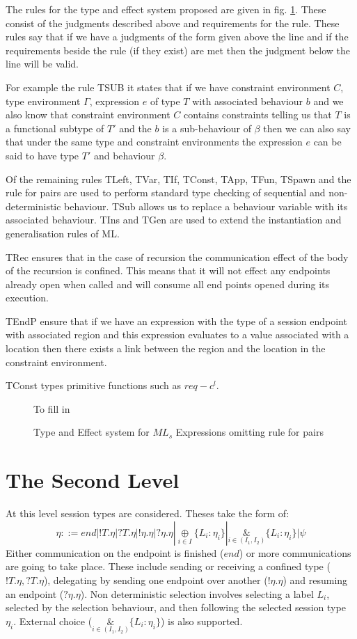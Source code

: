 The rules for the type and effect system proposed are given in fig. \ref{typeAndEffect}. These consist of the judgments described above and requirements for the rule. These rules say that if we have a judgments of the form given above the line and if the requirements beside the rule (if they exist) are met then the judgment below the line will be valid.

For example the rule TSUB it states that if we have constraint environment $C$, type environment $\Gamma$, expression $e$ of type $T$ with associated behaviour $b$ and we also know that constraint environment $C$ contains constraints telling us that $T$ is a functional subtype of $T'$ and the $b$ is a sub-behaviour of $\beta$ then we can also say that under the same type and constraint environments the expression $e$ can be said to have type $T'$ and behaviour $\beta$.

Of the remaining rules TLeft, TVar, TIf, TConst, TApp, TFun, TSpawn and the rule for pairs are used to perform standard type checking of sequential and non-deterministic behaviour. TSub allows us to replace a behaviour variable with its associated behaviour. TIns and TGen are used to extend the instantiation and generalisation rules of ML. 

TRec ensures that in the case of recursion the communication effect of the body of the recursion is confined. This means that it will not effect any endpoints already open when called and will consume all end points opened during its execution. 

TEndP ensure that if we have an expression with the type of a session endpoint with associated region and this expression evaluates to a value associated with a location then there exists a link between the region and the location in the constraint environment. 

TConst types primitive functions such as $req-c^l$.

\begin{figure}
To fill in
\caption{Type and Effect system for $ML_s$ Expressions omitting rule for pairs}
\label{typeAndEffect}
\end{figure}

\section{The Second Level} \label{level2}

At this level session types are considered. Theses take the form of: $$ \eta ::= end | !T.\eta | ?T.\eta | !\eta.\eta | ?\eta.\eta | \underset{i \in I}{\oplus}\{L_i : \eta_i\}| \underset{i \in (I_1,I_2)}{\&}\{L_i : \eta_i\} | \psi $$ Either communication on the endpoint is finished ($end$) or more communications are going to take place. These include sending or receiving a confined type ($!T.\eta,?T.\eta$), delegating by sending one endpoint over another ($!\eta.\eta $) and resuming an endpoint ($?\eta.\eta$). Non deterministic selection involves selecting a label $L_i$, selected by the selection behaviour, and then following the selected session type $\eta_i$. External choice ($\underset{i \in (I_1,I_2)}{\&}\{L_i : \eta_i\}$) is also supported.


